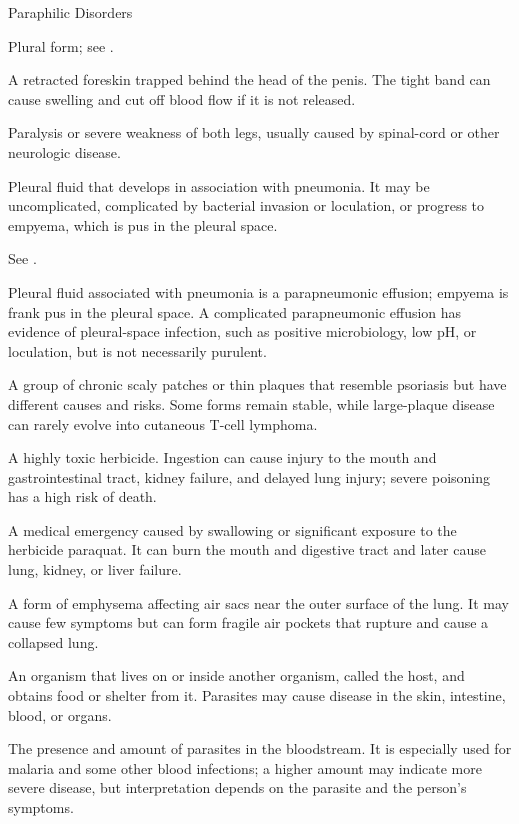 \synonyms
Paraphilic Disorders

 Plural form; see .

 A retracted foreskin trapped behind the head of the penis. The tight band can cause swelling and cut off blood flow if it is not released.

 Paralysis or severe weakness of both legs, usually caused by spinal-cord or other neurologic disease.

 Pleural fluid that develops in association with pneumonia. It may be uncomplicated, complicated by bacterial invasion or loculation, or progress to empyema, which is pus in the pleural space.

 See .

 Pleural fluid associated with pneumonia is a parapneumonic effusion; empyema is frank pus in the pleural space. A complicated parapneumonic effusion has evidence of pleural-space infection, such as positive microbiology, low pH, or loculation, but is not necessarily purulent.

 A group of chronic scaly patches or thin plaques that resemble psoriasis but have different causes and risks. Some forms remain stable, while large-plaque disease can rarely evolve into cutaneous T-cell lymphoma.

 A highly toxic herbicide. Ingestion can cause injury to the mouth and gastrointestinal tract, kidney failure, and delayed lung injury; severe poisoning has a high risk of death.

 A medical emergency caused by swallowing or significant exposure to the herbicide paraquat. It can burn the mouth and digestive tract and later cause lung, kidney, or liver failure.

 A form of emphysema affecting air sacs near the outer surface of the lung. It may cause few symptoms but can form fragile air pockets that rupture and cause a collapsed lung.

 An organism that lives on or inside another organism, called the host, and obtains food or shelter from it. Parasites may cause disease in the skin, intestine, blood, or organs.

 The presence and amount of parasites in the bloodstream. It is especially used for malaria and some other blood infections; a higher amount may indicate more severe disease, but interpretation depends on the parasite and the person’s symptoms.

